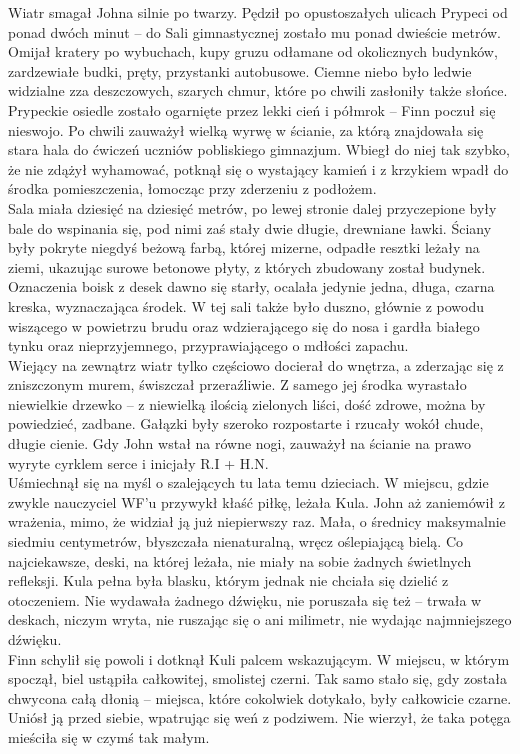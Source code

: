 \documentclass[../MAIN.tex]{subfiles}
\begin{document}
Wiatr smagał Johna silnie po twarzy. Pędził po opustoszałych ulicach Prypeci od ponad dwóch minut -- do Sali gimnastycznej zostało mu ponad dwieście metrów. Omijał kratery po wybuchach, kupy gruzu odłamane od okolicznych budynków, zardzewiałe budki, pręty, przystanki autobusowe. Ciemne niebo było ledwie widzialne zza deszczowych, szarych chmur, które po chwili zasłoniły także słońce. Prypeckie osiedle zostało ogarnięte przez lekki cień i półmrok -- Finn poczuł się nieswojo. Po chwili zauważył wielką wyrwę w ścianie, za którą znajdowała się stara hala do ćwiczeń uczniów pobliskiego gimnazjum. Wbiegł do niej tak szybko, że nie zdążył wyhamować, potknął się o wystający kamień i z krzykiem wpadł do środka pomieszczenia, łomocząc przy zderzeniu z podłożem.
\\
Sala miała dziesięć na dziesięć metrów, po lewej stronie dalej przyczepione były bale do wspinania się, pod nimi zaś stały dwie długie, drewniane ławki. Ściany były pokryte niegdyś beżową farbą, której mizerne, odpadłe resztki leżały na ziemi, ukazując surowe betonowe płyty, z których zbudowany został budynek. Oznaczenia boisk z desek dawno się starły, ocalała jedynie jedna, długa, czarna kreska, wyznaczająca środek. W tej sali także było duszno, głównie z powodu wiszącego w powietrzu brudu oraz wdzierającego się do nosa i gardła białego tynku oraz nieprzyjemnego, przyprawiającego o mdłości zapachu.\\ Wiejący na zewnątrz wiatr tylko częściowo docierał do wnętrza, a zderzając się z zniszczonym murem, świszczał przeraźliwie.
Z samego jej środka wyrastało niewielkie drzewko -- z niewielką ilością zielonych liści, dość zdrowe, można by powiedzieć, zadbane. Gałązki były szeroko rozpostarte i rzucały wokół chude, długie cienie. Gdy John wstał na równe nogi, zauważył na ścianie na prawo wyryte cyrklem serce i inicjały R.I + H.N.\\ Uśmiechnął się na myśl o szalejących tu lata temu dzieciach. W miejscu, gdzie zwykle nauczyciel WF’u przywykł kłaść piłkę, leżała Kula. John aż zaniemówił z wrażenia, mimo, że widział ją już niepierwszy raz. Mała, o średnicy maksymalnie siedmiu centymetrów, błyszczała nienaturalną, wręcz oślepiającą bielą. Co najciekawsze, deski, na której leżała, nie miały na sobie żadnych świetlnych refleksji. Kula pełna była blasku, którym jednak nie chciała się dzielić z otoczeniem. Nie wydawała żadnego dźwięku, nie poruszała się też -- trwała w deskach, niczym wryta, nie ruszając się o ani milimetr, nie wydając najmniejszego dźwięku. \\
Finn schylił się powoli i dotknął Kuli palcem wskazującym. W miejscu, w którym spoczął, biel ustąpiła całkowitej, smolistej czerni. Tak samo stało się, gdy została chwycona całą dłonią -- miejsca, które cokolwiek dotykało, były całkowicie czarne. Uniósł ją przed siebie, wpatrując się weń z podziwem. Nie wierzył, że taka potęga mieściła się w czymś tak małym.
\end{document}

